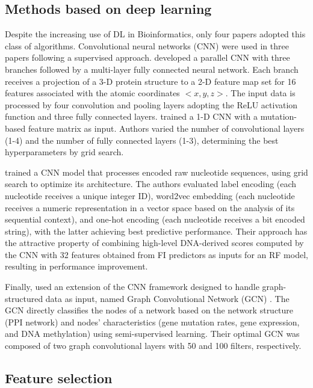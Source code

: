 \subsection{Methods based on deep learning}

Despite the increasing use of DL in Bioinformatics, only four \cite{Tavanaei2017, Agajanian2019, Luo2019, Schulte-Sasse2019} papers adopted this class of algorithms. Convolutional neural networks (CNN) were used in three papers \cite{Tavanaei2017, Agajanian2019, Luo2019} following a supervised approach. \citet{Tavanaei2017} developed a parallel CNN with three branches followed by a multi-layer fully connected neural network. Each branch receives a projection of a 3-D protein structure to a 2-D feature map set for 16 features associated with the atomic coordinates $<x, y, z>$. The input data is processed by four convolution and pooling layers adopting the ReLU activation function and three fully connected layers. \citet{Luo2019} trained a 1-D CNN with a mutation-based feature matrix as input. Authors varied the number of convolutional layers (1-4) and the number of fully connected layers (1-3), determining the best hyperparameters by grid search. 

\citet{Agajanian2019} trained a CNN model that processes encoded raw nucleotide sequences, using grid search to optimize its architecture. The authors evaluated label encoding (\ie each nucleotide receives a unique integer ID), word2vec embedding (\ie each nucleotide receives a numeric representation in a vector space based on the analysis of its sequential context), and one-hot encoding (\ie each nucleotide receives a bit encoded string), with the latter achieving best predictive performance. Their approach has the attractive property of combining high-level DNA-derived scores computed by the CNN with 32 features obtained from FI predictors as inputs for an RF model, resulting in performance improvement. 

Finally, \citet{Schulte-Sasse2019} used an extension of the CNN framework designed to handle graph-structured data as input, named Graph Convolutional Network (GCN) \cite{kipf2016semi}. The GCN directly classifies the nodes of a network based on the network structure (\eg PPI network) and nodes' characteristics (\eg gene mutation rates, gene expression, and DNA methylation) using semi-supervised learning. Their optimal GCN was composed of two graph convolutional layers with 50 and 100 filters, respectively.

\subsection{Feature selection}

